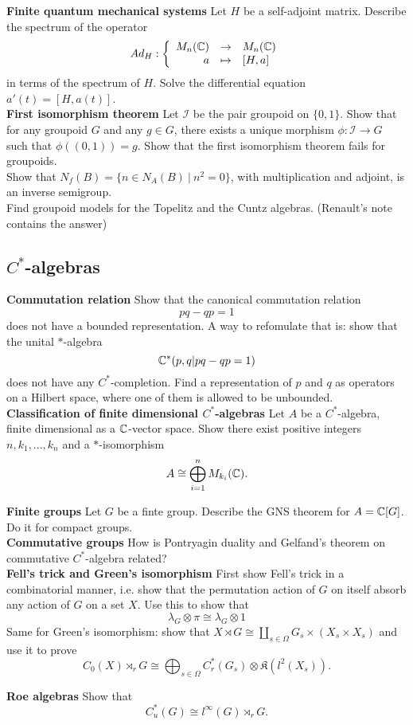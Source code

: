 \textbf{Finite quantum mechanical systems} Let $H$ be a self-adjoint matrix. Describe the spectrum of the operator
\[Ad_{H}:\left\{\begin{array}{rcl} M_n(\mathbb C) & \rightarrow & M_n(\mathbb C) \\ a & \mapsto & [H,a] \end{array}\right.\]
in terms of the spectrum of $H$. Solve the differential equation $a'(t) = [H,a(t)]$.\\

\textbf{First isomorphism theorem} Let $\mathcal I $ be the pair groupoid on $\{0,1\}$. Show that for any groupoid $G$ and any $g\in G$, there exists a unique morphism $\phi: \mathcal I \rightarrow G $ such that $\phi((0,1))=g$. Show that the first isomorphism theorem fails for groupoids. \\

Show that $N_f(B) = \{n \in N_A(B)\ | \ n^2 = 0\}$, with multiplication and adjoint, is an inverse semigroup.\\

Find groupoid models for the Topelitz and the Cuntz algebras. (Renault's note contains the answer)\\

\subsection{$C^*$-algebras}

\textbf{Commutation relation} Show that the canonical commutation relation \[ pq-qp = 1\]
does not have a bounded representation. A way to refomulate that is: show that the unital $*$-algebra 
\[ \mathbb C^*( p,q | pq-qp =1)\]
does not have any $C^*$-completion. Find a representation of $p$ and $q$ as operators on a Hilbert space, where one of them is allowed to be unbounded. \\

\textbf{Classification of finite dimensional $C^*$-algebras} Let $A$ be a $C^*$-algebra, finite dimensional as a $\mathbb C$-vector space. Show there exist positive integers $n,k_1,...,k_n$ and a $*$-isomorphism
\[A\cong \bigoplus_{i=1}^n M_{k_i}(\mathbb C).\]

\textbf{Finite groups} Let $G$ be a finte group. Describe the GNS theorem for $A=\mathbb C[G]$. Do it for compact groups.\\

\textbf{Commutative groups} How is Pontryagin duality and Gelfand's theorem on commutative $C^*$-algebra related?\\

\textbf{Fell's trick and Green's isomorphism}
First show Fell's trick in a combinatorial manner, i.e. show that the permutation action of $G$ on itself absorb any action of $G$ on a set $X$. Use this to show that 
\[\lambda_G \otimes \pi \cong \lambda_G \otimes 1\]
Same for Green's isomorphism: show that $X\rtimes G \cong \coprod_{s\in \Omega} G_s\times (X_s\times X_s)$ and use it to prove
\[C_0(X)\rtimes_r G \cong \bigoplus_{s\in \Omega} C^*_r(G_s)\otimes \mathfrak K(l^2(X_s)). \]

\textbf{Roe algebras}
Show that 
\[C^*_u(G) \cong l^\infty(G)\rtimes_r G.\]

 
